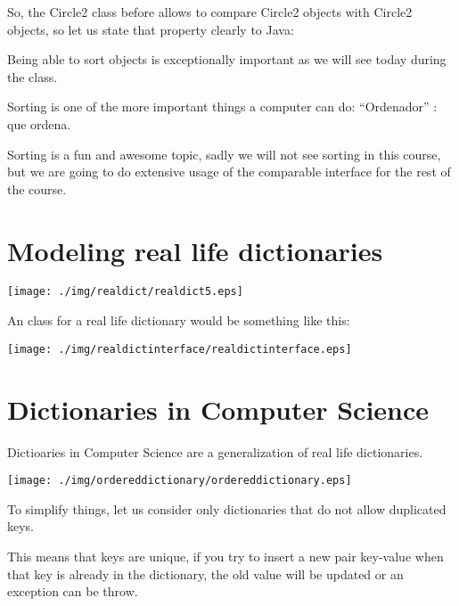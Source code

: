 \documentclass[a4paper, 9pt]{extarticle}
\begin{document}
So, the Circle2 class before allows to compare Circle2 objects with Circle2
objects, so let us state that property clearly to Java:


Being able to sort objects is exceptionally important as we will see today during the class.

Sorting is one of the more important things a computer can do: ``Ordenador'' : que ordena.

Sorting is a fun and awesome topic, sadly we will not see sorting in this course, but
we are going to do extensive usage of the comparable interface for the rest of
the course.

\newpage

\section{Modeling real life dictionaries}

\begin{center}
  \texttt{[image: ./img/realdict/realdict5.eps]}
\end{center}

An class for a real life dictionary would be something like this:

\begin{center}
  \texttt{[image: ./img/realdictinterface/realdictinterface.eps]}
\end{center}







\section{Dictionaries in Computer Science}

Dictioaries in Computer Science are a generalization of real life dictionaries.

\begin{center}
  \texttt{[image: ./img/ordereddictionary/ordereddictionary.eps]}
\end{center}

To simplify things, let us consider only dictionaries that do not allow duplicated keys.

This means that keys are unique, if you try to insert a new pair key-value when
that key is already in the dictionary, the old value will be updated or an
exception can be throw.
\end{document}
